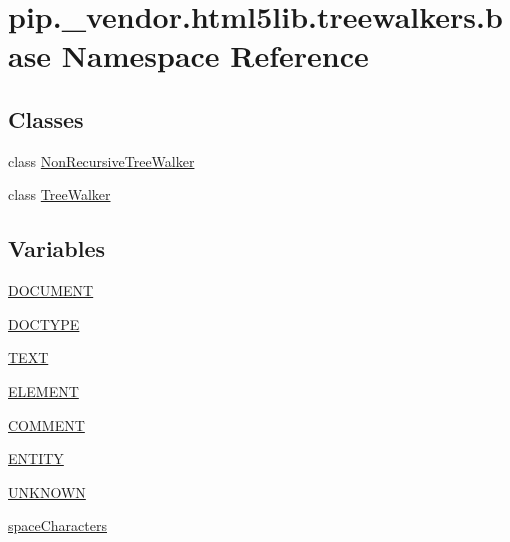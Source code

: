 \hypertarget{namespacepip_1_1__vendor_1_1html5lib_1_1treewalkers_1_1base}{}\section{pip.\+\_\+vendor.\+html5lib.\+treewalkers.\+base Namespace Reference}
\label{namespacepip_1_1__vendor_1_1html5lib_1_1treewalkers_1_1base}
\subsection*{Classes}
\begin{DoxyCompactItemize}
\item 
class \hyperlink{classpip_1_1__vendor_1_1html5lib_1_1treewalkers_1_1base_1_1NonRecursiveTreeWalker}{Non\+Recursive\+Tree\+Walker}
\item 
class \hyperlink{classpip_1_1__vendor_1_1html5lib_1_1treewalkers_1_1base_1_1TreeWalker}{Tree\+Walker}
\end{DoxyCompactItemize}
\subsection*{Variables}
\begin{DoxyCompactItemize}
\item 
\hyperlink{namespacepip_1_1__vendor_1_1html5lib_1_1treewalkers_1_1base_a5ba8a221523f6dfd132475cb0feb79bb}{D\+O\+C\+U\+M\+E\+NT}
\item 
\hyperlink{namespacepip_1_1__vendor_1_1html5lib_1_1treewalkers_1_1base_a63357e9517920474b08c8cb5662b22d0}{D\+O\+C\+T\+Y\+PE}
\item 
\hyperlink{namespacepip_1_1__vendor_1_1html5lib_1_1treewalkers_1_1base_ab464ac761ae1bf784ebd57776edea1d5}{T\+E\+XT}
\item 
\hyperlink{namespacepip_1_1__vendor_1_1html5lib_1_1treewalkers_1_1base_a63f16ffba630a79939d3d72926bbf7a3}{E\+L\+E\+M\+E\+NT}
\item 
\hyperlink{namespacepip_1_1__vendor_1_1html5lib_1_1treewalkers_1_1base_ad5f93307164e186a6146e0fe28476033}{C\+O\+M\+M\+E\+NT}
\item 
\hyperlink{namespacepip_1_1__vendor_1_1html5lib_1_1treewalkers_1_1base_a6623f91123a0e649e39f544dbd35cb3e}{E\+N\+T\+I\+TY}
\item 
\hyperlink{namespacepip_1_1__vendor_1_1html5lib_1_1treewalkers_1_1base_ab37152853c355e128367d43460d92bb4}{U\+N\+K\+N\+O\+WN}
\item 
\hyperlink{namespacepip_1_1__vendor_1_1html5lib_1_1treewalkers_1_1base_a61ee19778721cd0e7c360f37868594a8}{space\+Characters}
\end{DoxyCompactItemize}


